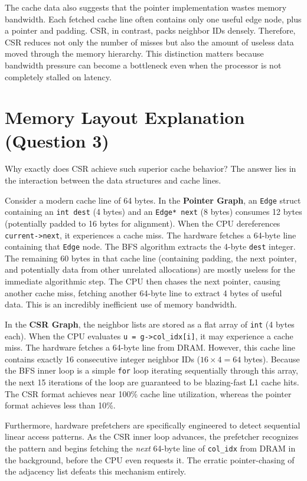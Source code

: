 \documentclass[11pt]{article}
\begin{document}
The cache data also suggests that the pointer implementation wastes memory bandwidth. Each fetched cache line often contains only one useful edge node, plus a pointer and padding. CSR, in contrast, packs neighbor IDs densely. Therefore, CSR reduces not only the number of misses but also the amount of useless data moved through the memory hierarchy. This distinction matters because bandwidth pressure can become a bottleneck even when the processor is not completely stalled on latency.

\section{Memory Layout Explanation (Question 3)}

Why exactly does CSR achieve such superior cache behavior? The answer lies in the interaction between the data structures and cache lines.

Consider a modern cache line of 64 bytes. 
In the \textbf{Pointer Graph}, an \texttt{Edge} struct containing an \texttt{int dest} (4 bytes) and an \texttt{Edge* next} (8 bytes) consumes 12 bytes (potentially padded to 16 bytes for alignment). When the CPU dereferences \texttt{current->next}, it experiences a cache miss. The hardware fetches a 64-byte line containing that \texttt{Edge} node. The BFS algorithm extracts the 4-byte \texttt{dest} integer. The remaining 60 bytes in that cache line (containing padding, the next pointer, and potentially data from other unrelated allocations) are mostly useless for the immediate algorithmic step. The CPU then chases the next pointer, causing another cache miss, fetching another 64-byte line to extract 4 bytes of useful data. This is an incredibly inefficient use of memory bandwidth.

In the \textbf{CSR Graph}, the neighbor lists are stored as a flat array of \texttt{int} (4 bytes each). When the CPU evaluates \texttt{u = g->col\_idx[i]}, it may experience a cache miss. The hardware fetches a 64-byte line from DRAM. However, this cache line contains exactly 16 consecutive integer neighbor IDs ($16 \times 4 = 64$ bytes). Because the BFS inner loop is a simple \texttt{for} loop iterating sequentially through this array, the next 15 iterations of the loop are guaranteed to be blazing-fast L1 cache hits. The CSR format achieves near 100\% cache line utilization, whereas the pointer format achieves less than 10\%.

Furthermore, hardware prefetchers are specifically engineered to detect sequential linear access patterns. As the CSR inner loop advances, the prefetcher recognizes the pattern and begins fetching the \textit{next} 64-byte line of \texttt{col\_idx} from DRAM in the background, before the CPU even requests it. The erratic pointer-chasing of the adjacency list defeats this mechanism entirely.
\end{document}
